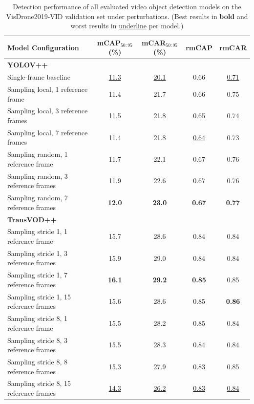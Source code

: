 \documentclass[final,twoside]{vutinfth}
\begin{document}
\begin{table}[H]
\centering
\caption{Detection performance of all evaluated video object detection models on the VisDrone2019-VID validation set under perturbations. (Best results in \textbf{bold} and worst results in \underline{underline} per model.)}

\small
\setlength{\tabcolsep}{4pt}

\begin{tabular}{p{} c c c c}
\toprule
\rowcolor{tableheader}
\textbf{Model Configuration} & \textbf{mCAP$_{50:95}$ (\%)} & \textbf{mCAR$_{50:95}$ (\%)} & \textbf{rmCAP} & \textbf{rmCAR} \\
\midrule
\multicolumn{5}{l}{\textbf{YOLOV++}} \\
Single-frame baseline                 & \underline{11.3} & \underline{20.1} & 0.66 & \underline{0.71} \\
Sampling local, 1 reference frame     & 11.4 & 21.7 & 0.66 & 0.75 \\
Sampling local, 3 reference frames    & 11.5 & 21.8 & 0.65 & 0.74 \\
Sampling local, 7 reference frames    & 11.4 & 21.8 & \underline{0.64} & 0.73 \\
Sampling random, 1 reference frame    & 11.7 & 22.1 & 0.67 & 0.76 \\
Sampling random, 3 reference frames   & 11.9 & 22.6 & 0.67 & 0.76 \\
Sampling random, 7 reference frames   & \textbf{12.0} & \textbf{23.0} & \textbf{0.67} & \textbf{0.77} \\
\midrule
\multicolumn{5}{l}{\textbf{TransVOD++}} \\
Sampling stride 1, 1 reference frame & 15.7 & 28.6 & 0.84 & 0.84 \\
Sampling stride 1, 3 reference frames & 15.9 & 29.0 & 0.84 & 0.84 \\
Sampling stride 1, 7 reference frames & \textbf{16.1} & \textbf{29.2} & \textbf{0.85} & 0.85 \\
Sampling stride 1, 15 reference frames & 15.6 & 28.6 & 0.85 & \textbf{0.86} \\
Sampling stride 8, 1 reference frame & 15.5 & 28.2 & 0.85 & 0.84 \\
Sampling stride 8, 3 reference frames & 15.5 & 28.3 & 0.84 & 0.84 \\
Sampling stride 8, 8 reference frames & 15.3 & 27.9 & 0.83 & 0.85 \\
Sampling stride 8, 15 reference frames & \underline{14.3} & \underline{26.2} & \underline{0.83} & \underline{0.84} \\
\bottomrule
\end{tabular}\label{tab:perturbated_results}
\end{table}
\end{document}
